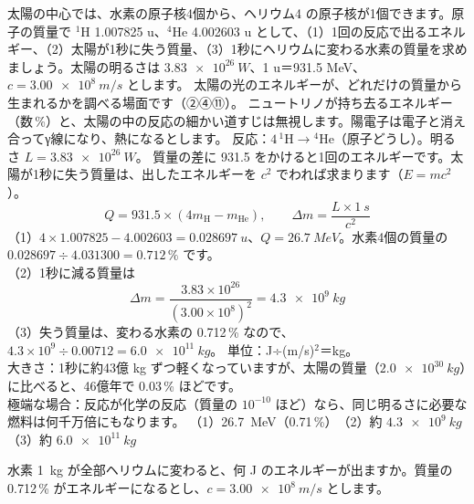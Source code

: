 \label{ph:原-11:ex4}
\begin{phreidai}
太陽の中心では、水素の原子核4個から、ヘリウム4 の原子核が1個できます。原子の質量で ${}^1$H 1.007825 u、${}^4$He 4.002603 u として、（1）1回の反応で出るエネルギー、（2）太陽が1秒に失う質量、（3）1秒にヘリウムに変わる水素の質量を求めましょう。太陽の明るさは $\qty{3.83e26}{W}$、1 u＝931.5 MeV、$c=\qty{3.00e8}{m/s}$ とします。
\phbamen
太陽の光のエネルギーが、どれだけの質量から生まれるかを調べる場面です（②④⑪）。
\phmushi
ニュートリノが持ち去るエネルギー（数\,\%）と、太陽の中の反応の細かい道すじは無視します。陽電子は電子と消え合ってγ線になり、熱になるとします。
\phzu
反応：$4\,{}^1\mathrm H\to{}^4\mathrm{He}$（原子どうし）。明るさ $L=\qty{3.83e26}{W}$。
\phriyu
質量の差に 931.5 をかけると1回のエネルギーです。太陽が1秒に失う質量は、出したエネルギーを $c^2$ でわれば求まります（$E=mc^2$）。
\phtateru
\[ Q=931.5\times(4m_{\mathrm H}-m_{\mathrm{He}}),\qquad\Delta m=\frac{L\times\qty{1}{s}}{c^2} \]
\phtoku
（1）$4\times1.007825-4.002603=\qty{0.028697}{u}$、$Q=\qty{26.7}{MeV}$。水素4個の質量の $0.028697\div4.031300=0.712\,\%$ です。\\
（2）1秒に減る質量は
\[ \Delta m=\frac{3.83\times10^{26}}{(3.00\times10^8)^2}=\qty{4.3e9}{kg} \]
（3）失う質量は、変わる水素の 0.712\,\% なので、$4.3\times10^9\div0.00712=\qty{6.0e11}{kg}$。
\phtashikame
単位：J÷(m/s)$^2$＝kg。\\
大きさ：1秒に約43億 kg ずつ軽くなっていますが、太陽の質量（$\qty{2.0e30}{kg}$）に比べると、46億年で 0.03\,\% ほどです。\\
極端な場合：反応が化学の反応（質量の $10^{-10}$ ほど）なら、同じ明るさに必要な燃料は何千万倍にもなります。
\kotae （1）\qty{26.7}{MeV}（0.71\,\%）　（2）約 $\qty{4.3e9}{kg}$　（3）約 $\qty{6.0e11}{kg}$
\end{phreidai}
\begin{jibun}
水素 \qty{1}{kg} が全部ヘリウムに変わると、何 J のエネルギーが出ますか。質量の 0.712\,\% がエネルギーになるとし、$c=\qty{3.00e8}{m/s}$ とします。
\end{jibun}

